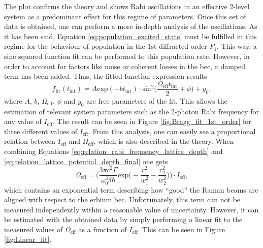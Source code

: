 The plot confirms the theory and shows Rabi oscillations in an effective 2-level system as a predominant effect for this regime of parameters. Once this set of data is obtained, one can perform a more in-depth analysis of the oscillations. As it has been said, Equation \ref{eq:population_excited_state} must be fulfilled in this regime for the behaviour of population in the 1st diffracted order $P_1$. This way, a sine squared function fit can be performed to this population rate. However, in order to account for factors like noise or coherent losses in the \ac{bec}, a damped term has been added. Thus, the fitted function expression results
\begin{equation}
	f_\text{fit}(t_\text{int}) = A \text{exp}(-b t_\text{int}) \cdot \text{sin}^2\bigg(\frac{\Omega_\text{eff}t_\text{int}}{2} +\phi\bigg) + y_0,
\end{equation}
where $A$, $b$, $\Omega_\text{eff}$, $\phi$ and $y_0$ are free parameters of the fit. This allows the estimation of relevant system parameters such as the 2-photon Rabi frequency for any value of $I_\text{eff}$. The result can be seen in Figure \ref{fig:Bragg_fit_1st_order} for three different values of $I_\text{eff}$. From this analysis, one can easily see a proportional relation between $I_\text{eff}$ and $\Omega_\text{eff}$, which is also described in the theory. When combining Equations \eqref{eq:relation_rabi_frequency_lattice_depth} and \eqref{eq:relation_lattice_potential_depth_final} one gets
\begin{equation}\label{eq:relation_Ieff_omega_eff}
	\Omega_\text{eff} = \Bigg(\frac{3 \pi c^2 \Gamma}{\omega_0^3 \delta \hbar} \text{exp}\bigg(-\frac{r_1^2}{w_1^2}-\frac{r_2^2}{w_2^2}\bigg)\Bigg) \cdot I_\text{eff},
\end{equation}
which contains an exponential term describing how ``good'' the Raman beams are aligned with respect to the erbium \ac{bec}. Unfortunately, this term can not be measured independently within a reasonable value of uncertainty. However, it can be estimated with the obtained data by simply performing a linear fit to the measured values of $\Omega_\text{eff}$ as a function of $I_\text{eff}$. This can be seen in Figure \ref{fig:Linear_fit}.


